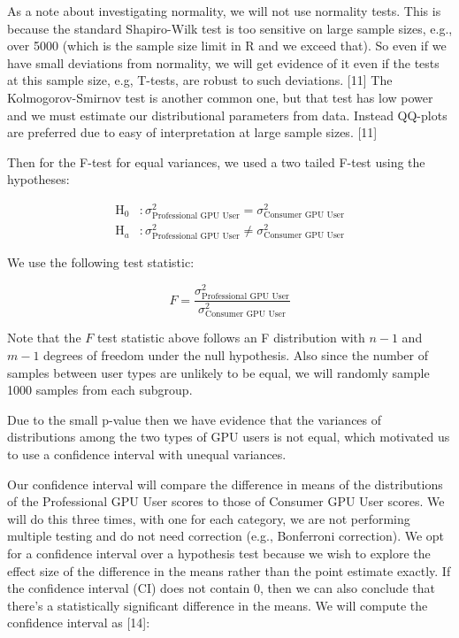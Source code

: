 \documentclass[
]{article}
\begin{document}
As a note about investigating normality, we will not use normality
tests. This is because the standard Shapiro-Wilk test is too sensitive
on large sample sizes, e.g., over 5000 (which is the sample size limit
in R and we exceed that). So even if we have small deviations from
normality, we will get evidence of it even if the tests at this sample
size, e.g, T-tests, are robust to such deviations. {[}11{]} The
Kolmogorov-Smirnov test is another common one, but that test has low
power and we must estimate our distributional parameters from data.
Instead QQ-plots are preferred due to easy of interpretation at large
sample sizes. {[}11{]}

Then for the F-test for equal variances, we used a two tailed F-test
using the hypotheses:

\[
\begin{aligned}
\text{H}_0&: \sigma^2_\text{Professional GPU User} = \sigma^2_\text{Consumer GPU User}\\
\text{H}_a&: \sigma^2_\text{Professional GPU User} \neq \sigma^2_\text{Consumer GPU User}
\end{aligned}
\]

We use the following test statistic:

\[
F = \frac{\sigma^2_\text{Professional GPU User}}{\sigma^2_\text{Consumer GPU User}}
\]

Note that the \(F\) test statistic above follows an F distribution with
\(n-1\) and \(m-1\) degrees of freedom under the null hypothesis. Also
since the number of samples between user types are unlikely to be equal,
we will randomly sample 1000 samples from each subgroup.

Due to the small p-value then we have evidence that the variances of
distributions among the two types of GPU users is not equal, which
motivated us to use a confidence interval with unequal variances.

Our confidence interval will compare the difference in means of the
distributions of the Professional GPU User scores to those of Consumer
GPU User scores. We will do this three times, with one for each
category, we are not performing multiple testing and do not need
correction (e.g., Bonferroni correction). We opt for a confidence
interval over a hypothesis test because we wish to explore the effect
size of the difference in the means rather than the point estimate
exactly. If the confidence interval (CI) does not contain 0, then we can
also conclude that there's a statistically significant difference in the
means. We will compute the confidence interval as {[}14{]}:
\end{document}
